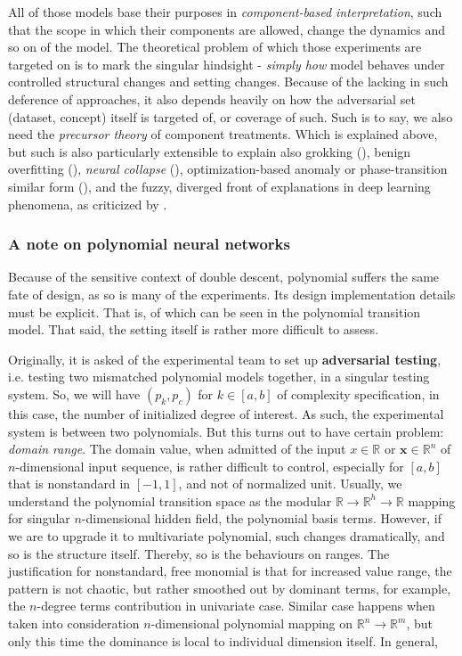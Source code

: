 All of those models base their purposes in \textit{component-based interpretation}, such that the scope in which their components are allowed, change the dynamics and so on of the model. The theoretical problem of which those experiments are targeted on is to mark the singular hindsight - \textit{simply how} model behaves under controlled structural changes and setting changes. Because of the lacking in such deference of approaches, it also depends heavily on how the adversarial set (dataset, concept) itself is targeted of, or coverage of such. Such is to say, we also need the \textit{precursor theory} of component treatments. Which is explained above, but such is also particularly extensible to explain also grokking (\cite{Power2022Grokking,Liu2023GrokkingExplained}), benign overfitting (\cite{Bartlett2020BenignOverfitting,Muthukumar2021Interpolation}), \textit{neural collapse} (\cite{Papyan2020NeuralCollapse,Han2022NeuralCollapseSurvey}), optimization-based anomaly or phase-transition similar form (\cite{Cohen2021EdgeOfStability,Fort2019DeepLossLandscape}), and the fuzzy, diverged front of explanations in deep learning phenomena, as criticized by \cite{Razeghi2025ExplanationCritique}. 

\subsubsection{A note on polynomial neural networks}

Because of the sensitive context of double descent, polynomial suffers the same fate of design, as so is many of the experiments. Its design implementation details must be explicit. That is, of which can be seen in the polynomial transition model. That said, the setting itself is rather more difficult to assess. 

Originally, it is asked of the experimental team to set up \textbf{adversarial testing}, i.e. testing two mismatched polynomial models together, in a singular testing system. So, we will have $(p_{k},p_{c})$ for $k\in[a,b]$ of complexity specification, in this case, the number of initialized degree of interest. As such, the experimental system is between two polynomials. But this turns out to have certain problem: \textit{domain range}. The domain value, when admitted of the input $x\in\mathbb{R}$ or $\mathbf{x}\in\mathbb{R}^{n}$ of $n$-dimensional input sequence, is rather difficult to control, especially for $[a,b]$ that is nonstandard in $[-1,1]$, and not of normalized unit. Usually, we understand the polynomial transition space as the modular $\mathbb{R}\to\mathbb{R}^{h}\to\mathbb{R}$ mapping for singular $n$-dimensional hidden field, the polynomial basis terms. However, if we are to upgrade it to multivariate polynomial, such changes dramatically, and so is the structure itself. Thereby, so is the behaviours on ranges. The justification for nonstandard, free monomial is that for increased value range, the pattern is not chaotic, but rather smoothed out by dominant terms, for example, the $n$-degree terms contribution in univariate case. Similar case happens when taken into consideration $n$-dimensional polynomial mapping on $\mathbb{R}^{n}\to\mathbb{R}^{m}$, but only this time the dominance is local to individual dimension itself. In general,

